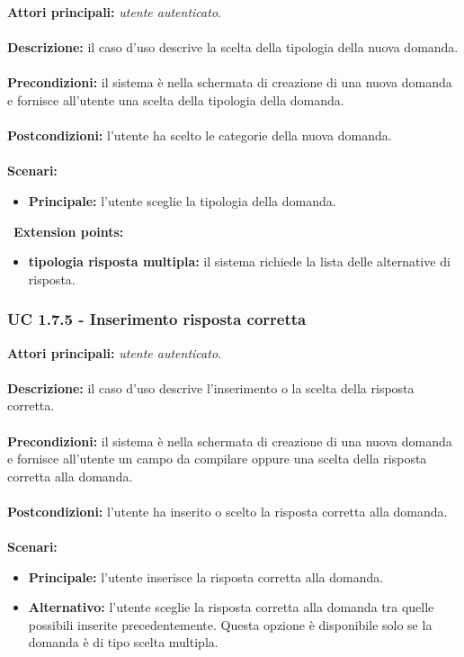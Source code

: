 \documentclass[a4paper,11pt]{article}
\begin{document}
\textbf{Attori principali:} \textit{utente autenticato}.\\
\\
\textbf{Descrizione:} il caso d'uso descrive la scelta della tipologia della nuova domanda. \\
\\
\textbf{Precondizioni:} il sistema è nella schermata di creazione di una nuova domanda e fornisce all'utente una scelta della tipologia della domanda.\\
\\
\textbf{Postcondizioni:} l'utente ha scelto le categorie della nuova domanda. \\
\\
\textbf{Scenari:}
\begin{itemize}
\item \textbf{Principale:} l'utente sceglie la tipologia della domanda.
\end{itemize}
\
\textbf{Extension points:}
\begin{itemize}
\item \textbf{tipologia risposta multipla:} il sistema richiede la lista delle alternative di risposta.
\end{itemize}
\vspace{6 mm}
\subsubsection{UC 1.7.5 - Inserimento risposta corretta}

\textbf{Attori principali:} \textit{utente autenticato}.\\
\\
\textbf{Descrizione:} il caso d'uso descrive l'inserimento o la scelta della risposta corretta. \\
\\
\textbf{Precondizioni:} il sistema è nella schermata di creazione di una nuova domanda e fornisce all'utente un campo da compilare oppure una scelta della risposta corretta alla domanda.\\
\\
\textbf{Postcondizioni:} l'utente ha inserito o scelto la risposta corretta alla domanda. \\
\\
\textbf{Scenari:}
\begin{itemize}
\item \textbf{Principale:} l'utente inserisce la risposta corretta alla domanda.
\item \textbf{Alternativo:} l'utente sceglie la risposta corretta alla domanda tra quelle possibili inserite precedentemente. Questa opzione è disponibile solo se la domanda è di tipo scelta multipla.
\end{itemize}
\vspace{6 mm}
\end{document}
